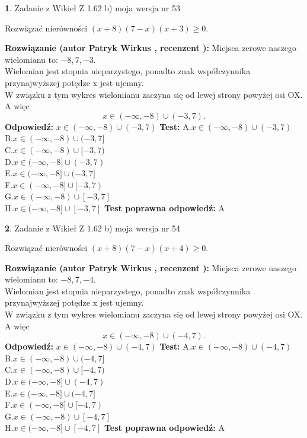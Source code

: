 \documentclass[12pt, a4paper]{article}
\theoremstyle{definition} %
\newtheorem{zad}{}
\newcommand{\zadStart}[1]{\begin{zad}#1\newline}
\newcommand{\zadStop}{\end{zad}}
\newcommand{\rozwStart}[2]{\noindent \textbf{Rozwiązanie (autor #1 , recenzent #2): }\newline}
\newcommand{\rozwStop}{\newline}
\newcommand{\odpStart}{\noindent \textbf{Odpowiedź:}\newline}
\newcommand{\odpStop}{\newline}
\newcommand{\testStart}{\noindent \textbf{Test:}\newline}
\newcommand{\testStop}{\newline}
\newcommand{\kluczStart}{\noindent \textbf{Test poprawna odpowiedź:}\newline}
\newcommand{\kluczStop}{\newline}
\begin{document}
\zadStart{Zadanie z Wikieł Z 1.62 b) moja wersja nr 53}

Rozwiązać nierówności $(x+8)(7-x)(x+3)\ge0$.
\zadStop
\rozwStart{Patryk Wirkus}{}
Miejsca zerowe naszego wielomianu to: $-8, 7, -3$.\\
Wielomian jest stopnia nieparzystego, ponadto znak współczynnika przy\linebreak najwyższej potędze x jest ujemny.\\ W związku z tym wykres wielomianu zaczyna się od lewej strony powyżej osi OX. A więc $$x \in (-\infty,-8) \cup (-3,7).$$
\rozwStop
\odpStart
$x \in (-\infty,-8) \cup (-3,7)$
\odpStop
\testStart
A.$x \in (-\infty,-8) \cup (-3,7)$\\
B.$x \in (-\infty,-8) \cup (-3,7]$\\
C.$x \in (-\infty,-8) \cup [-3,7)$\\
D.$x \in (-\infty,-8] \cup (-3,7)$\\
E.$x \in (-\infty,-8] \cup (-3,7]$\\
F.$x \in (-\infty,-8] \cup [-3,7)$\\
G.$x \in (-\infty,-8) \cup [-3,7]$\\
H.$x \in (-\infty,-8] \cup [-3,7]$
\testStop
\kluczStart
A
\kluczStop



\zadStart{Zadanie z Wikieł Z 1.62 b) moja wersja nr 54}

Rozwiązać nierówności $(x+8)(7-x)(x+4)\ge0$.
\zadStop
\rozwStart{Patryk Wirkus}{}
Miejsca zerowe naszego wielomianu to: $-8, 7, -4$.\\
Wielomian jest stopnia nieparzystego, ponadto znak współczynnika przy\linebreak najwyższej potędze x jest ujemny.\\ W związku z tym wykres wielomianu zaczyna się od lewej strony powyżej osi OX. A więc $$x \in (-\infty,-8) \cup (-4,7).$$
\rozwStop
\odpStart
$x \in (-\infty,-8) \cup (-4,7)$
\odpStop
\testStart
A.$x \in (-\infty,-8) \cup (-4,7)$\\
B.$x \in (-\infty,-8) \cup (-4,7]$\\
C.$x \in (-\infty,-8) \cup [-4,7)$\\
D.$x \in (-\infty,-8] \cup (-4,7)$\\
E.$x \in (-\infty,-8] \cup (-4,7]$\\
F.$x \in (-\infty,-8] \cup [-4,7)$\\
G.$x \in (-\infty,-8) \cup [-4,7]$\\
H.$x \in (-\infty,-8] \cup [-4,7]$
\testStop
\kluczStart
A
\kluczStop
\end{document}

